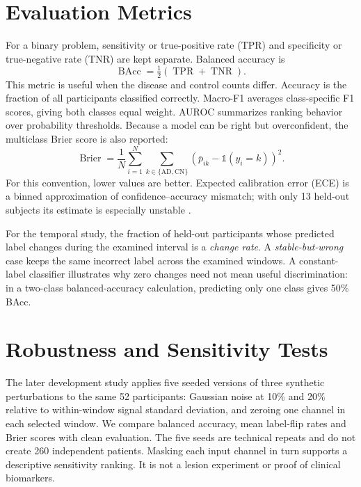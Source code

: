 \section{Evaluation Metrics}
For a binary problem, sensitivity or true-positive rate (TPR) and specificity or true-negative rate (TNR) are kept separate. Balanced accuracy is
\begin{equation}
\operatorname{BAcc}=\tfrac{1}{2}(\operatorname{TPR}+\operatorname{TNR}).
\end{equation}
This metric is useful when the disease and control counts differ. Accuracy is the fraction of all participants classified correctly. Macro-F1 averages class-specific F1 scores, giving both classes equal weight. AUROC summarizes ranking behavior over probability thresholds. Because a model can be right but overconfident, the multiclass Brier score is also reported:
\begin{equation}
\operatorname{Brier}=\frac{1}{N}\sum_{i=1}^{N}\sum_{k\in\{\mathrm{AD,CN}\}}\left(\bar p_{ik}-\mathbb{1}(y_i=k)\right)^2.
\end{equation}
For this convention, lower values are better. Expected calibration error (ECE) is a binned approximation of confidence--accuracy mismatch; with only 13 held-out subjects its estimate is especially unstable \cite{guo2017calibration}.

For the temporal study, the fraction of held-out participants whose predicted label changes during the examined interval is a \emph{change rate}. A \emph{stable-but-wrong} case keeps the same incorrect label across the examined windows. A constant-label classifier illustrates why zero changes need not mean useful discrimination: in a two-class balanced-accuracy calculation, predicting only one class gives 50\% BAcc.

\section{Robustness and Sensitivity Tests}
The later development study applies five seeded versions of three synthetic perturbations to the same 52 participants: Gaussian noise at 10\% and 20\% relative to within-window signal standard deviation, and zeroing one channel in each selected window. We compare balanced accuracy, mean label-flip rates and Brier scores with clean evaluation. The five seeds are technical repeats and do not create 260 independent patients. Masking each input channel in turn supports a descriptive sensitivity ranking. It is not a lesion experiment or proof of clinical biomarkers.

